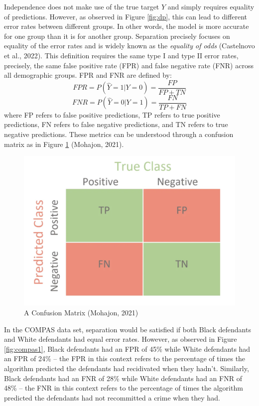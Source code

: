 \documentclass[12pt, twoside]{amherstthesis}
\begin{document}
Independence does not make use of the true target \(Y\) and simply requires equality of predictions. However, as observed in Figure \ref{fig:dp}, this can lead to different error rates between different groups. In other words, the model is more accurate for one group than it is for another group. Separation precisely focuses on equality of the error rates and is widely known as the \emph{equality of odds} (Castelnovo et al., 2022). This definition requires the same type I and type II error rates, precisely, the same false positive rate (FPR) and false negative rate (FNR) across all demographic groups. FPR and FNR are defined by:
\begin{equation}
\label{ch1eq6}
FPR = P(\hat{Y} = 1| Y = 0) = \frac{FP}{FP + TN}
\end{equation}
\begin{equation}
\label{ch1eq7}
FNR = P(\hat{Y} = 0| Y = 1) = \frac{FN}{TP + FN}
\end{equation}
where FP refers to false positive predictions, TP refers to true positive predictions, FN refers to false negative predictions, and TN refers to true negative predictions. These metrics can be understood through a confusion matrix as in Figure \ref{fig:confusionmatrix} (Mohajon, 2021).
\begin{figure}

{\centering \includegraphics[width=0.75\linewidth]{figures/confusionmatrix} 

}

\caption[A Confusion Matrix]{A Confusion Matrix (Mohajon, 2021)}\label{fig:confusionmatrix}
\end{figure}
In the COMPAS data set, separation would be satisfied if both Black defendants and White defendants had equal error rates. However, as observed in Figure \ref{fig:compas1}, Black defendants had an FPR of 45\% while White defendants had an FPR of 24\% -- the FPR in this context refers to the percentage of times the algorithm predicted the defendants had recidivated when they hadn't. Similarly, Black defendants had an FNR of 28\% while White defendants had an FNR of 48\% -- the FNR in this context refers to the percentage of times the algorithm predicted the defendants had not recommitted a crime when they had.
\end{document}
